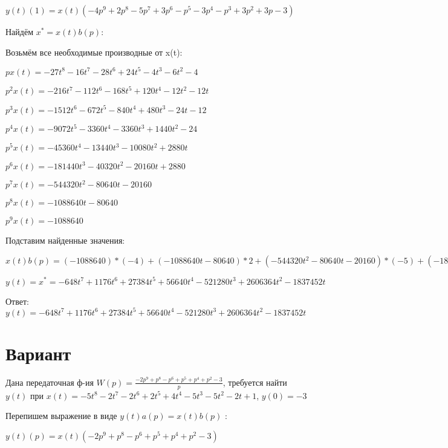 \documentclass{article}
\begin{document}
{{{{{$y(t)(1)=x(t)(-4p^{9}+2p^{8}-5p^{7}+3p^{6}-p^{5}-3p^{4}-p^{3}+3p^{2}+3p-3)$

Найдём $x^*=x(t)b(p)$:

Возьмём все необходимые производные от x(t):

$px(t)=-27t^{8}-16t^{7}-28t^{6}+24t^{5}-4t^{3}-6t^{2}-4$

$p^2x(t)=-216t^{7}-112t^{6}-168t^{5}+120t^{4}-12t^{2}-12t$

$p^3x(t)=-1512t^{6}-672t^{5}-840t^{4}+480t^{3}-24t-12$

$p^4x(t)=-9072t^{5}-3360t^{4}-3360t^{3}+1440t^{2}-24$

$p^5x(t)=-45360t^{4}-13440t^{3}-10080t^{2}+2880t$

$p^6x(t)=-181440t^{3}-40320t^{2}-20160t+2880$

$p^7x(t)=-544320t^{2}-80640t-20160$

$p^8x(t)=-1088640t-80640$

$p^9x(t)=-1088640$

Подставим найденные значения:

$x(t)b(p) = (-1088640)*(-4)+(-1088640t-80640)*2+(-544320t^{2}-80640t-20160)*(-5)+(-181440t^{3}-40320t^{2}-20160t+2880)*3+(-45360t^{4}-13440t^{3}-10080t^{2}+2880t)*(-1)+(-9072t^{5}-3360t^{4}-3360t^{3}+1440t^{2}-24)*(-3)+(-1512t^{6}-672t^{5}-840t^{4}+480t^{3}-24t-12)*(-1)+(-216t^{7}-112t^{6}-168t^{5}+120t^{4}-12t^{2}-12t)*3+(-27t^{8}-16t^{7}-28t^{6}+24t^{5}-4t^{3}-6t^{2}-4)*3+(-27t^{8}-16t^{7}-28t^{6}+24t^{5}-4t^{3}-6t^{2}-4)*(-3)=-648t^{7}+1176t^{6}+27384t^{5}+56640t^{4}-521280t^{3}+2606364t^{2}-1837452t$





$y(t)=x^*=-648t^{7}+1176t^{6}+27384t^{5}+56640t^{4}-521280t^{3}+2606364t^{2}-1837452t$

Ответ: $y(t) = -648t^{7}+1176t^{6}+27384t^{5}+56640t^{4}-521280t^{3}+2606364t^{2}-1837452t$

\section{Вариант}

Дана передаточная ф-ия $W(p)=\frac{-2p^{9}+p^{8}-p^{6}+p^{5}+p^{4}+p^{2}-3}{p}$, требуется найти $y(t)$ при $x(t)=-5t^{8}-2t^{7}-2t^{6}+2t^{5}+4t^{4}-5t^{3}-5t^{2}-2t+1$, $y(0)=-3$

Перепишем выражение в виде $y(t)a(p)=x(t)b(p)$ :

$y(t)(p)=x(t)(-2p^{9}+p^{8}-p^{6}+p^{5}+p^{4}+p^{2}-3)$

}}}}}
\end{document}

